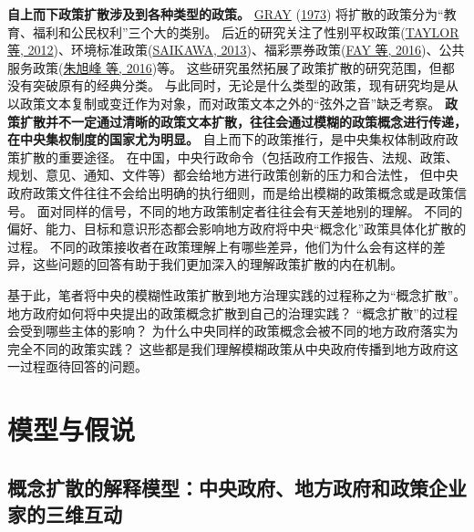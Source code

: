 \documentclass[
  12pt,
]{ctexart}
\begin{document}
\textbf{自上而下政策扩散涉及到各种类型的政策。}
\protect\hyperlink{ref-Gray1973}{GRAY} (\protect\hyperlink{ref-Gray1973}{1973}) 将扩散的政策分为``教育、福利和公民权利''三个大的类别。
后近的研究关注了性别平权政策(\protect\hyperlink{ref-TaylorEtAl2012}{TAYLOR 等, 2012})、环境标准政策(\protect\hyperlink{ref-Saikawa2013}{SAIKAWA, 2013})、福彩票券政策(\protect\hyperlink{ref-FayWenger2016}{FAY 等, 2016})、公共服务政策(\protect\hyperlink{ref-ZhuXuFengZhaoHui2016}{朱旭峰 等, 2016})等。
这些研究虽然拓展了政策扩散的研究范围，但都没有突破原有的经典分类。
与此同时，无论是什么类型的政策，现有研究均是从以政策文本复制或变迁作为对象，而对政策文本之外的``弦外之音''缺乏考察。
\textbf{政策扩散并不一定通过清晰的政策文本扩散，往往会通过模糊的政策概念进行传递，在中央集权制度的国家尤为明显。}
自上而下的政策推行，是中央集权体制政府政策扩散的重要途径。
在中国，中央行政命令（包括政府工作报告、法规、政策、规划、意见、通知、文件等）都会给地方进行政策创新的压力和合法性，
但中央政府政策文件往往不会给出明确的执行细则，而是给出模糊的政策概念或是政策信号。
面对同样的信号，不同的地方政策制定者往往会有天差地别的理解。
不同的偏好、能力、目标和意识形态都会影响地方政府将中央``概念化''政策具体化扩散的过程。
不同的政策接收者在政策理解上有哪些差异，他们为什么会有这样的差异，这些问题的回答有助于我们更加深入的理解政策扩散的内在机制。

基于此，笔者将中央的模糊性政策扩散到地方治理实践的过程称之为``概念扩散''。
地方政府如何将中央提出的政策概念扩散到自己的治理实践？
``概念扩散''的过程会受到哪些主体的影响？
为什么中央同样的政策概念会被不同的地方政府落实为完全不同的政策实践？
这些都是我们理解模糊政策从中央政府传播到地方政府这一过程亟待回答的问题。

\hypertarget{ux6a21ux578bux4e0eux5047ux8bf4}{%
\section{模型与假说}\label{ux6a21ux578bux4e0eux5047ux8bf4}}

\hypertarget{ux6982ux5ff5ux6269ux6563ux7684ux89e3ux91caux6a21ux578bux4e2dux592eux653fux5e9cux5730ux65b9ux653fux5e9cux548cux653fux7b56ux4f01ux4e1aux5bb6ux7684ux4e09ux7ef4ux4e92ux52a8}{%
\subsection{概念扩散的解释模型：中央政府、地方政府和政策企业家的三维互动}\label{ux6982ux5ff5ux6269ux6563ux7684ux89e3ux91caux6a21ux578bux4e2dux592eux653fux5e9cux5730ux65b9ux653fux5e9cux548cux653fux7b56ux4f01ux4e1aux5bb6ux7684ux4e09ux7ef4ux4e92ux52a8}}
\end{document}
